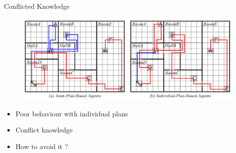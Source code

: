 \documentclass{bredelebeamer}
\begin{document}
\begin{frame}{Conflicted Knowledge}

\begin{figure}[h!]
  \includegraphics[width=\linewidth]{../article/img/behavious.png}
  \label{fig:behave}
\end{figure}

\begin{block}{}
\begin{itemize}
\item Poor behaviour with individual plans
\item Conflict knowledge
\item How to avoid it ?
\end{itemize}
\end{block}

\end{frame}
\end{document}
